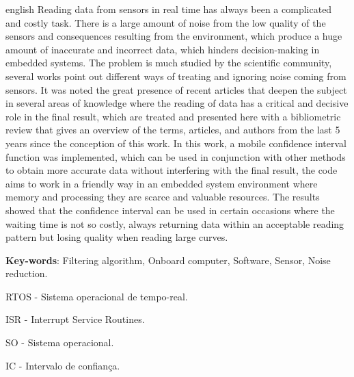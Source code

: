 \begin{resumo}[Abstract]
	\begin{otherlanguage*}{english}
		Reading data from sensors in real time has always been a complicated and costly task. There is a large amount of noise from the low quality of the sensors and consequences resulting from the environment, which produce a huge amount of inaccurate and incorrect data, which hinders decision-making in embedded systems. The problem is much studied by the scientific community, several works point out different ways of treating and ignoring noise coming from sensors. It was noted the great presence of recent articles that deepen the subject in several areas of knowledge where the reading of data has a critical and decisive role in the final result, which are treated and presented here with a bibliometric review that gives an overview of the terms, articles, and authors from the last 5 years since the conception of this work. In this work, a mobile confidence interval function was implemented, which can be used in conjunction with other methods to obtain more accurate data without interfering with the final result, the code aims to work in a friendly way in an embedded system environment where memory and processing they are scarce and valuable resources. The results showed that the confidence interval can be used in certain occasions where the waiting time is not so costly, always returning data within an acceptable reading pattern but losing quality when reading large curves. 
		\vspace{\onelineskip}

		\noindent
		\textbf{Key-words}: Filtering algorithm, Onboard computer, Software, Sensor, Noise reduction.
	\end{otherlanguage*}
\end{resumo}


\listoffigures*

\newpage
{}
\newpage
\listoftables*
\cleardoublepage

\begin{siglas}
	\item RTOS - Sistema operacional de tempo-real.
	\item ISR - Interrupt Service Routines.
	\item SO - Sistema operacional.
	\item IC - Intervalo de confiança.
\end{siglas}


\tableofcontents*
\cleardoublepage

